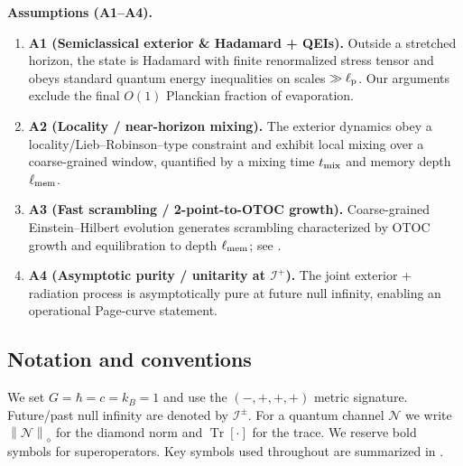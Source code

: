 \documentclass[a4paper,11pt]{article}
\newcommand{\Ddiamond}[1]{\left\|#1\right\|_\diamond}
\newenvironment{boxedresult}[1]{\begin{infobox}\noindent\textbf{#1.}}{\end{infobox}}
\newcommand{\Tr}{\operatorname{Tr}}
\theoremstyle{plain}
\theoremstyle{definition}
\theoremstyle{remark}
\begin{document}
\begin{boxedresult}{Assumptions (A1--A4)}\label{box:assumptions}
\begin{enumerate}[leftmargin=*,itemsep=0.25em]
  \item \textbf{A1 (Semiclassical exterior \& Hadamard + QEIs).} Outside a stretched horizon, the state is Hadamard with finite renormalized stress tensor and obeys standard quantum energy inequalities on scales $\gg \ell_{\rm p}$. Our arguments exclude the final $O(1)$ Planckian fraction of evaporation.
  \item \textbf{A2 (Locality / near-horizon mixing).} The exterior dynamics obey a locality/Lieb--Robinson--type constraint and exhibit local mixing over a coarse-grained window, quantified by a mixing time $t_{\rm mix}$ and memory depth $\ell_{\rm mem}$.
  \item \textbf{A3 (Fast scrambling / 2-point-to-OTOC growth).} Coarse-grained Einstein--Hilbert evolution generates scrambling characterized by OTOC growth and equilibration to depth $\ell_{\rm mem}$; see .
  \item \textbf{A4 (Asymptotic purity / unitarity at $\mathscr{I}^+$).} The joint exterior + radiation process is asymptotically pure at future null infinity, enabling an operational Page-curve statement.
\end{enumerate}
\end{boxedresult}

\subsection{Notation and conventions}
\label{sec:notation}
We set $G=\hbar=c=k_B=1$ and use the $(-,+,+,+)$ metric signature. Future/past null infinity are denoted by $\mathscr{I}^\pm$. For a quantum channel $\mathcal{N}$ we write $\Ddiamond{\mathcal{N}}$ for the diamond norm and $\Tr[\cdot]$ for the trace. We reserve bold symbols for superoperators. Key symbols used throughout are summarized in .
\end{document}
